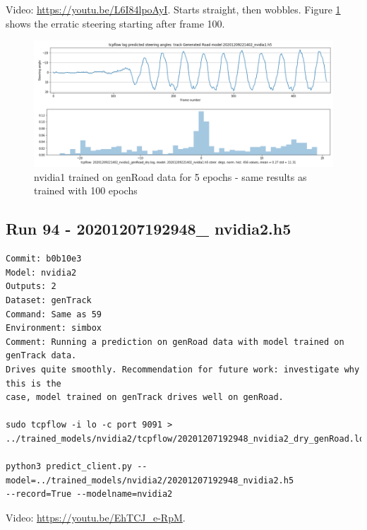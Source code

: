 Video: \url{https://youtu.be/L6I84lpoAyI}. Starts straight, then wobbles. 
Figure \ref{fig:20201209221402_nvidia1_genRoad_dry} shows the erratic steering starting after frame 100.
\begin{figure}[ht]
 \centering 
 \includegraphics[width=\textwidth]{Figures/20201209221402_nvidia1_genRoad_dry.png}
 \caption{nvidia1 trained on genRoad data for 5 epochs - same results as trained with 100 epochs}
 \label{fig:20201209221402_nvidia1_genRoad_dry} 
\end{figure}

\subsection{Run 94 - 20201207192948\_ nvidia2.h5 }
\label{app_res:94}
\begin{verbatim}
Commit: b0b10e3
Model: nvidia2
Outputs: 2 
Dataset: genTrack
Command: Same as 59
Environment: simbox
Comment: Running a prediction on genRoad data with model trained on genTrack data.
Drives quite smoothly. Recommendation for future work: investigate why this is the
case, model trained on genTrack drives well on genRoad.

sudo tcpflow -i lo -c port 9091 >
../trained_models/nvidia2/tcpflow/20201207192948_nvidia2_dry_genRoad.log

python3 predict_client.py --model=../trained_models/nvidia2/20201207192948_nvidia2.h5
--record=True --modelname=nvidia2

\end{verbatim}
Video: \url{https://youtu.be/EhTCJ_e-RpM}. 

